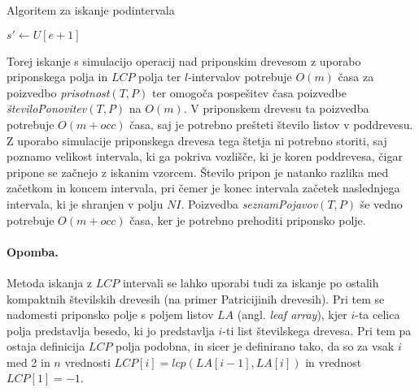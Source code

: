 \begin{algorithm}[htb]

    \caption{Algoritem za iskanje podintervala }\label{alg:interval}
    {
                    {$s'\leftarrow U[e+1]$}

            {\Vrni{$[s,s'-1]$}}


                {\Vrni{$[s',e]$}}
        
        {\Vrni{$[-1,-1]$}}    
    }
\end{algorithm}


Torej iskanje s simulacijo operacij nad priponskim drevesom z uporabo priponskega polja in $LCP$ polja ter $l$-intervalov potrebuje $O(m)$ časa za poizvedbo \textit{prisotnost}$(T,P)$ ter omogoča pospešitev časa poizvedbe \textit{številoPonovitev}$(T,P)$ na $O(m)$. V priponskem drevesu ta poizvedba potrebuje $O(m+occ)$ časa, saj je potrebno prešteti število listov v poddrevesu. Z uporabo simulacije priponskega drevesa tega štetja ni potrebno storiti, saj poznamo velikost intervala, ki ga pokriva vozlišče, ki je koren poddrevesa, čigar pripone se začnejo z iskanim vzorcem. Število pripon je natanko razlika med začetkom in koncem intervala, pri čemer je konec intervala začetek naslednjega intervala, ki je shranjen v polju $NI$. Poizvedba \textit{seznamPojavov}$(T,P)$ še vedno potrebuje $O(m+occ)$ časa, ker je potrebno prehoditi priponsko polje.

\paragraph{Opomba.}
Metoda iskanja z $LCP$ intervali se lahko uporabi tudi za iskanje po ostalih kompaktnih številskih drevesih (na primer Patricijinih drevesih). Pri tem se nadomesti priponsko polje s poljem listov $LA$ (angl. \textit{leaf array}), kjer $i$-ta celica polja predstavlja besedo, ki jo predstavlja $i$-ti list številskega drevesa. Pri tem pa ostaja definicija $LCP$ polja podobna, in sicer je definirano tako, da so za vsak $i$ med 2 in $n$ vrednosti $LCP[i]=lcp(LA[i-1],LA[i])$ in vrednost $LCP[1]=-1$.

